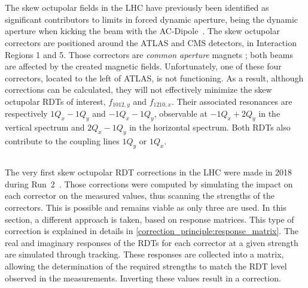\chapter{}
\label{chapter:skew_octupole_fields}
\thumbforchapter{}


\section{}

The skew octupolar fields in the LHC have previously been identified as significant contributors to 
limits in forced dynamic aperture, being the dynamic aperture when kicking the beam with the
AC-Dipole~\cite{carlier_nonlinear_2020}. The skew octupolar correctors are positioned around the
ATLAS and CMS detectors, in Interaction Regions 1 and 5. Those correctors are \textit{common
aperture} magnets ; both beams are affected by the created magnetic fields. Unfortunately, one of
these four correctors, located to the left of ATLAS, is not functioning. As a result, although
corrections can be calculated, they will not effectively minimize the skew octupolar RDTs of
interest, $f_{1012,y}$ and $f_{1210,x}$. Their associated resonances are respectively $1Q_x - 1Q_y$
and $-1Q_x - 1Q_y$, observable at $-1Q_x + 2Q_y$ in the vertical spectrum and $2Q_x -1Q_y$ in the
horizontal spectrum. Both RDTs also contribute to the coupling lines $1Q_y$ or $1Q_x$.


\section{}

The very first skew octupolar RDT corrections in the LHC were made in 2018 during
Run~2~\cite{carlier_nonlinear_2020}. Those corrections were computed by simulating the impact on
each corrector on the measured values, thus scanning the strengths of the correctors. This is
possible and remains viable as only three are used.
In this section, a different approach is taken, based on response matrices. This type of correction
is explained in details in \cref{correction_principle:response_matrix}. The real and imaginary 
responses of the RDTs for each corrector at a given strength are simulated through tracking.  These
responses are collected into a matrix, allowing the determination of the required strengths to match
the RDT level observed in the measurements. Inverting these values result in a correction.



